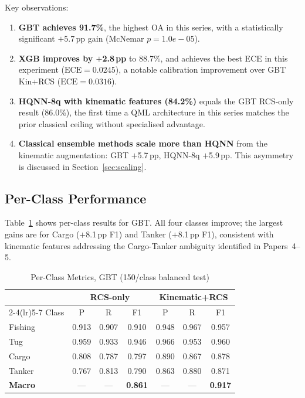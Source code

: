 \documentclass[journal]{IEEEtran}
\begin{document}
Key observations:
\begin{enumerate}
\item \textbf{GBT achieves 91.7\%}, the highest OA in this series,
  with a statistically significant $+$5.7\,pp
  gain (McNemar $p = 1.0e-05$).
\item \textbf{XGB improves by $+$2.8\,pp}
  to 88.7\%, and achieves the best ECE in this experiment
  ($\text{ECE} = 0.0245$), a notable
  calibration improvement over GBT Kin+RCS ($\text{ECE}=0.0316$).
\item \textbf{HQNN-8q with kinematic features (84.2\%)}
  equals the GBT RCS-only result (86.0\%),
  the first time a QML architecture in this series matches the prior
  classical ceiling without specialised advantage.
\item \textbf{Classical ensemble methods scale more than HQNN} from
  the kinematic augmentation: GBT $+$5.7\,pp,
  HQNN-8q $+$5.9\,pp. This asymmetry is
  discussed in Section~\ref{sec:scaling}.
\end{enumerate}

\subsection{Per-Class Performance}

Table~\ref{tab:perclass} shows per-class results for GBT. All four
classes improve; the largest gains are for Cargo ($+$8.1\,pp F1) and
Tanker ($+$8.1\,pp F1), consistent with kinematic features addressing
the Cargo-Tanker ambiguity identified in Papers~4--5.


\begin{table}[t]
\centering
\caption{Per-Class Metrics, GBT (150/class balanced test)}
\label{tab:perclass}
\begin{tabular}{lcccccc}
\toprule
 & \multicolumn{3}{c}{RCS-only} & \multicolumn{3}{c}{Kinematic+RCS} \\
\cmidrule(lr){2-4}\cmidrule(lr){5-7}
Class & P & R & F1 & P & R & F1 \\
\midrule
  Fishing  & 0.913 & 0.907 & 0.910 & 0.948 & 0.967 & 0.957 \\
  Tug      & 0.959 & 0.933 & 0.946 & 0.966 & 0.953 & 0.960 \\
  Cargo    & 0.808 & 0.787 & 0.797 & 0.890 & 0.867 & 0.878 \\
  Tanker   & 0.767 & 0.813 & 0.790 & 0.863 & 0.880 & 0.871 \\
  \midrule
  \textbf{Macro} & --- & --- & \textbf{0.861} & --- & --- & \textbf{0.917} \\
\bottomrule
\end{tabular}
\end{table}
\end{document}
